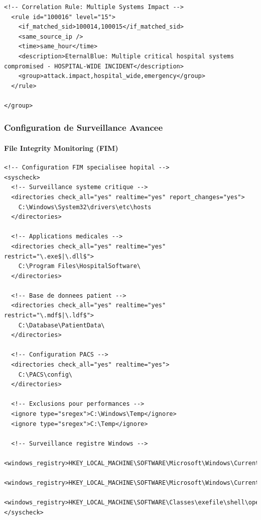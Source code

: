 \begin{lstlisting}[style=xmlstyle,caption=Regles EternalBlue specialisees pour environnement hospitalier]
  <!-- Correlation Rule: Multiple Systems Impact -->
  <rule id="100016" level="15">
    <if_matched_sid>100014,100015</if_matched_sid>
    <same_source_ip />
    <time>same_hour</time>
    <description>EternalBlue: Multiple critical hospital systems compromised - HOSPITAL-WIDE INCIDENT</description>
    <group>attack.impact,hospital_wide,emergency</group>
  </rule>

</group>
\end{lstlisting}

\subsubsection{Configuration de Surveillance Avancee}

\paragraph{File Integrity Monitoring (FIM)}

\begin{lstlisting}[style=xmlstyle,caption=Configuration FIM pour systemes medicaux]
<!-- Configuration FIM specialisee hopital -->
<syscheck>
  <!-- Surveillance systeme critique -->
  <directories check_all="yes" realtime="yes" report_changes="yes">
    C:\Windows\System32\drivers\etc\hosts
  </directories>
  
  <!-- Applications medicales -->
  <directories check_all="yes" realtime="yes" restrict="\.exe$|\.dll$">
    C:\Program Files\HospitalSoftware\
  </directories>
  
  <!-- Base de donnees patient -->
  <directories check_all="yes" realtime="yes" restrict="\.mdf$|\.ldf$">
    C:\Database\PatientData\
  </directories>
  
  <!-- Configuration PACS -->
  <directories check_all="yes" realtime="yes">
    C:\PACS\config\
  </directories>
  
  <!-- Exclusions pour performances -->
  <ignore type="sregex">C:\Windows\Temp</ignore>
  <ignore type="sregex">C:\Temp</ignore>
  
  <!-- Surveillance registre Windows -->
  <windows_registry>HKEY_LOCAL_MACHINE\SOFTWARE\Microsoft\Windows\CurrentVersion\Run</windows_registry>
  <windows_registry>HKEY_LOCAL_MACHINE\SOFTWARE\Microsoft\Windows\CurrentVersion\RunOnce</windows_registry>
  <windows_registry>HKEY_LOCAL_MACHINE\SOFTWARE\Classes\exefile\shell\open\command</windows_registry>
</syscheck>
\end{lstlisting}

